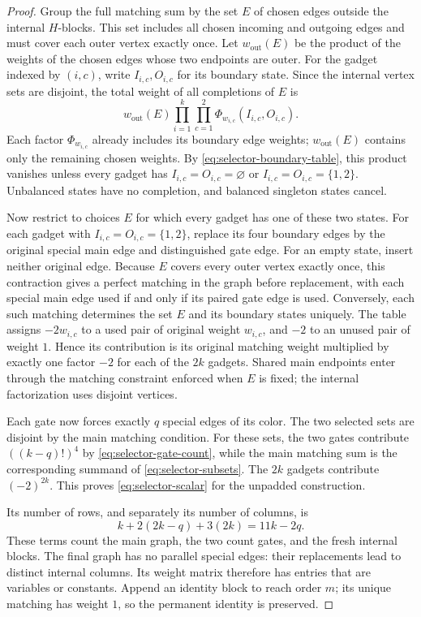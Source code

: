 \begin{proof}


Group the full matching sum by the set $E$ of chosen edges outside the
internal $H$-blocks.
This set includes all chosen incoming and outgoing edges and must cover
each outer vertex exactly once.  Let $w_{\mathrm{out}}(E)$ be the product
of the weights of the chosen edges whose two endpoints are outer.
For the gadget indexed by $(i,c)$, write $I_{i,c},O_{i,c}$ for its
boundary state.  Since the internal vertex sets are disjoint, the total
weight of all completions of $E$ is
\[
 w_{\mathrm{out}}(E)
 \prod_{i=1}^k\prod_{c=1}^2
 \Phi_{w_{i,c}}(I_{i,c},O_{i,c}).
\]
Each factor $\Phi_{w_{i,c}}$ already includes its boundary edge weights;
$w_{\mathrm{out}}(E)$ contains only the remaining chosen weights.
By \eqref{eq:selector-boundary-table}, this
product vanishes unless every gadget has $I_{i,c}=O_{i,c}=\varnothing$
or $I_{i,c}=O_{i,c}=\{1,2\}$.  Unbalanced states have no completion,
and balanced singleton states cancel.

Now restrict to choices $E$ for which every gadget has one of these two states.
For each gadget with $I_{i,c}=O_{i,c}=\{1,2\}$, replace its four boundary
edges by the original special main edge and distinguished gate edge.
For an empty state, insert neither original edge.  Because $E$ covers every
outer vertex exactly once, this contraction gives a perfect matching in the
graph before replacement, with each special main edge used if and only if
its paired gate edge is used.  Conversely, each such matching determines
the set $E$ and its boundary states uniquely.  The table assigns $-2w_{i,c}$
to a used pair of original weight $w_{i,c}$, and $-2$ to an unused pair of weight
$1$.  Hence its contribution is its original matching weight multiplied
by exactly one factor $-2$ for each of the $2k$ gadgets.  Shared main
endpoints enter through the matching constraint enforced when $E$ is fixed;
the internal factorization uses disjoint vertices.

Each gate now forces exactly $q$ special edges of its color.  The two
selected sets are disjoint by the main matching condition.  For these
sets, the two gates contribute $((k-q)!)^4$ by
\eqref{eq:selector-gate-count}, while the main matching sum is the
corresponding summand of \eqref{eq:selector-subsets}.  The $2k$ gadgets
contribute $(-2)^{2k}$.  This proves \eqref{eq:selector-scalar} for the
unpadded construction.

Its number of rows, and separately its number of columns, is
\begin{equation}
 k+2(2k-q)+3(2k)=11k-2q.
 \label{eq:selector-size}
\end{equation}
These terms count the main graph, the two count gates, and the fresh
internal blocks.  The final graph has no parallel special edges: their
replacements lead to distinct internal columns.  Its weight matrix
therefore has entries that are variables or constants.  Append an
identity block to reach order $m$; its unique matching has weight $1$,
so the permanent identity is preserved.


\end{proof}
